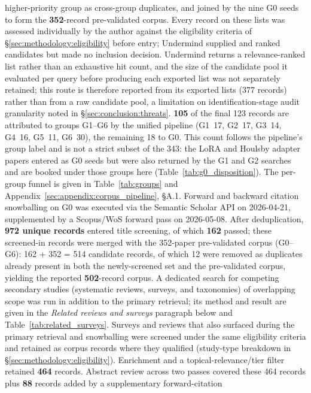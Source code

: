 higher-priority group as cross-group duplicates, and joined by the nine G0
seeds to form the \textbf{352}-record pre-validated corpus. Every record on
these lists was assessed individually by the author against the eligibility
criteria of \S\ref{sec:methodology:eligibility} before entry; Undermind
supplied and ranked candidates but made no inclusion decision. Undermind
returns a relevance-ranked list rather than an exhaustive hit count, and the
size of the candidate pool it evaluated per query before producing each
exported list was not separately retained; this route is therefore reported
from its exported lists (377 records) rather than from a raw candidate pool,
a limitation on identification-stage audit granularity noted in
\S\ref{sec:conclusion:threats}. \textbf{105} of the final 123 records are
attributed to groups G1--G6 by the unified pipeline
(G1~17, G2~17, G3~14, G4~16, G5~11, G6~30), the remaining 18 to G0. This
count follows the pipeline's group label and is not a strict subset of the
343: the LoRA and Houlsby adapter papers entered as G0 seeds but were also
returned by the G1 and G2 searches and are booked under those groups here
(Table~\ref{tab:g0_disposition}). The per-group funnel is given in
Table~\ref{tab:groups} and Appendix~\ref{sec:appendix:corpus_pipeline}, \S A.1.
Forward and
backward citation snowballing on G0 was executed via the Semantic Scholar API
on 2026-04-21, supplemented by a Scopus/WoS forward pass on 2026-05-08.
\fussy After deduplication, \textbf{972 unique records} entered title screening, of
which \textbf{162} passed; these screened-in records were merged with the
352-paper pre-validated corpus (G0--G6): 162 + 352 = 514 candidate records, of
which 12 were removed as duplicates already present in both the newly-screened
set and the pre-validated corpus, yielding the reported \textbf{502}-record
corpus. A dedicated search for competing secondary studies (systematic
reviews, surveys, and taxonomies) of overlapping scope was run in addition to
the primary retrieval; its method and result are given in the \emph{Related
reviews and surveys} paragraph below and Table~\ref{tab:related_surveys}.
Surveys and reviews that also surfaced during the primary retrieval and
snowballing were screened under the same eligibility criteria and retained as
corpus records where they qualified (study-type breakdown in
\S\ref{sec:methodology:eligibility}). Enrichment and a topical-relevance/tier filter
retained \textbf{464} records. Abstract review across two passes covered these
464 records plus \textbf{88} records added by a supplementary forward-citation
